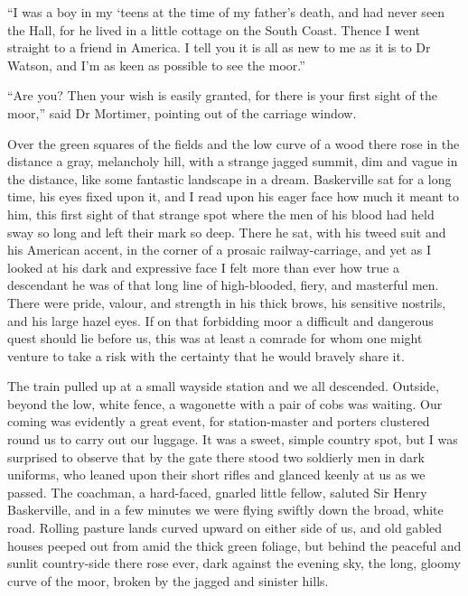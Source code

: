 \documentclass[paper=5.5in:8.5in,BCOR=7mm,twoside,DIV=calc,12pt,usegeometry,openany,chapterprefix,endperiod,headings=big]{scrbook} %
\begin{document}
\enquote{I was a boy in my `teens at the time of my father's death, and had never seen the Hall, for he lived in a little cottage on the South Coast. Thence I went straight to a friend in America. I tell you it is all as new to me as it is to Dr Watson, and I'm as keen as possible to see the moor.}

\enquote{Are you? Then your wish is easily granted, for there is your first sight of the moor,} said Dr Mortimer, pointing out of the carriage window.


Over the green squares of the fields and the low curve of a wood there rose in the distance a gray, melancholy hill, with a strange jagged summit, dim and vague in the distance, like some fantastic landscape in a dream. Baskerville sat for a long time, his eyes fixed upon it, and I read upon his eager face how much it meant to him, this first sight of that strange spot where the men of his blood had held sway so long and left their mark so deep. There he sat, with his tweed suit and his American accent, in the corner of a prosaic railway-carriage, and yet as I looked at his dark and expressive face I felt more than ever how true a descendant he was of that long line of high-blooded, fiery, and masterful men. There were pride, valour, and strength in his thick brows, his sensitive nostrils, and his large hazel eyes. If on that forbidding moor a difficult and dangerous quest should lie before us, this was at least a comrade for whom one might venture to take a risk with the certainty that he would bravely share it.

The train pulled up at a small wayside station and we all descended. Outside, beyond the low, white fence, a wagonette with a pair of cobs was waiting. Our coming was evidently a great event, for station-master and porters clustered round us to carry out our luggage. It was a sweet, simple country spot, but I was surprised to observe that by the gate there stood two soldierly men in dark uniforms, who leaned upon their short rifles and glanced keenly at us as we passed. The coachman, a hard-faced, gnarled little fellow, saluted Sir Henry Baskerville, and in a few minutes we were flying swiftly down the broad, white road. Rolling pasture lands curved upward on either side of us, and old gabled houses peeped out from amid the thick green foliage, but behind the peaceful and sunlit country-side there rose ever, dark against the evening sky, the long, gloomy curve of the moor, broken by the jagged and sinister hills.
\end{document}
